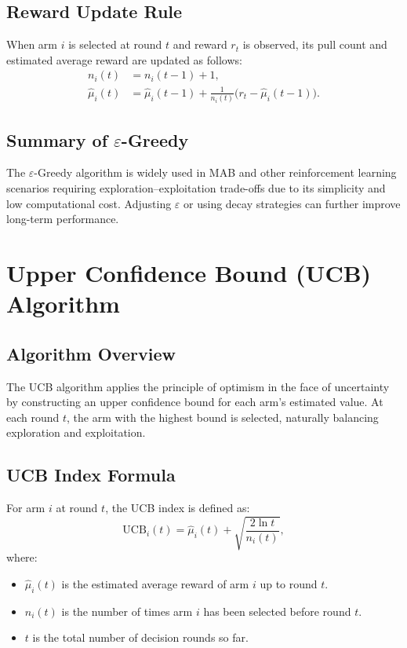 \documentclass{article}
\begin{document}
\subsection{Reward Update Rule}
When arm $i$ is selected at round $t$ and reward $r_t$ is observed, its pull count and estimated average reward are updated as follows:
\begin{align}
  n_i(t) &= n_i(t-1) + 1, \\
  \hat\mu_i(t)
    &= \hat\mu_i(t-1)
     + \frac{1}{n_i(t)}\bigl(r_t - \hat\mu_i(t-1)\bigr).
\end{align}

\subsection{Summary of $\varepsilon$-Greedy}
The $\varepsilon$-Greedy algorithm is widely used in MAB and other reinforcement learning scenarios requiring exploration–exploitation trade-offs due to its simplicity and low computational cost. Adjusting $\varepsilon$ or using decay strategies can further improve long-term performance.

\section{Upper Confidence Bound (UCB) Algorithm}
\subsection{Algorithm Overview}
The UCB algorithm applies the principle of optimism in the face of uncertainty by constructing an upper confidence bound for each arm’s estimated value. At each round $t$, the arm with the highest bound is selected, naturally balancing exploration and exploitation.

\subsection{UCB Index Formula}
For arm $i$ at round $t$, the UCB index is defined as:
\[
\mathrm{UCB}_i(t) = \hat\mu_i(t) + \sqrt{\frac{2\ln t}{n_i(t)}},
\]
where:
\begin{itemize}
  \item $\hat\mu_i(t)$ is the estimated average reward of arm $i$ up to round $t$.
  \item $n_i(t)$ is the number of times arm $i$ has been selected before round $t$.
  \item $t$ is the total number of decision rounds so far.
\end{itemize}
\end{document}
